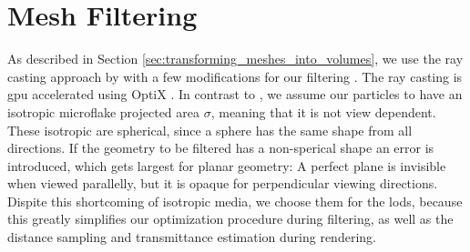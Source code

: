 \section{Mesh Filtering}
\label{sec:mesh_filtering}
As described in Section \ref{sec:transforming_meshes_into_volumes}, we use the ray casting approach by \citeauthor{hybrid_mesh_volume_lods} with a few modifications for our filtering \cite{hybrid_mesh_volume_lods}.
The ray casting is \ac{gpu} accelerated using OptiX \cite{parker_optix}.
In contrast to \citeauthor{hybrid_mesh_volume_lods}, we assume our particles to have an isotropic microflake projected area $\sigma$, meaning that it is not view dependent.
These isotropic are spherical, since a sphere has the same shape from all directions.
If the geometry to be filtered has a non-sperical shape an error is introduced, which gets largest for planar geometry: A perfect plane is invisible when viewed parallelly, but it is opaque for perpendicular viewing directions.
Dispite this shortcoming of isotropic media, we choose them for the \acsp{lod}, because this greatly simplifies our optimization procedure during filtering, as well as the distance sampling and transmittance estimation during rendering.

